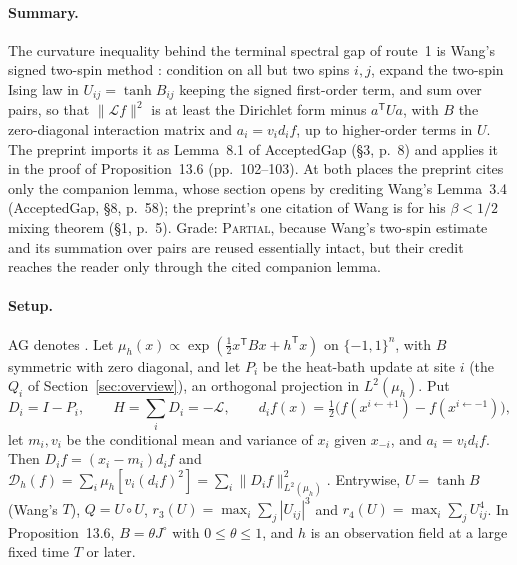 \documentclass[11pt]{article}
\newcommand{\D}{\mathcal{D}}
\newcommand{\Lgen}{\mathcal{L}}
\newcommand{\norm}[1]{\lVert #1\rVert}
\newcommand{\ploc}[2]{#1}
\newcommand{\sloc}[2]{\cite[#2]{#1}}
\newcommand{\grade}[1]{\textsc{#1}}
\begin{document}
\paragraph{Summary.}
The curvature inequality behind the terminal spectral gap of route~1 is
Wang's signed two-spin method
\sloc{Wang2026-OptimalMixingGlauberSKBetaHalf}{Lemma~3.4 and proof of
Thm~1.2, pp.~10--13}: condition on all but two spins $i,j$, expand the
two-spin Ising law in $U_{ij}=\tanh B_{ij}$ keeping the signed first-order
term, and sum over pairs, so that $\norm{\Lgen f}^2$ is at least the Dirichlet
form minus $a^{\mathsf T}Ua$, with $B$ the zero-diagonal interaction matrix and
$a_i=v_id_if$, up to higher-order terms in $U$. The
preprint imports it as Lemma~8.1 of AcceptedGap
\ploc{(\S3, p.~8)}{accepted-inputs.tex:91--94} and applies it in the proof
of \ploc{Proposition~13.6 (pp.~102--103)}{profile-positive.tex:1584--1698}.
At both places the preprint cites only the companion lemma, whose section
opens by crediting Wang's Lemma~3.4
\ploc{(AcceptedGap, \S8, p.~58)}{terminal.tex:8--11}; the preprint's one
citation of Wang is for his $\beta<1/2$ mixing theorem
\ploc{(\S1, p.~5)}{introduction.tex:182--185}.
Grade: \grade{Partial}, because Wang's two-spin estimate and its summation
over pairs are reused essentially intact, but their credit reaches the reader
only through the cited companion lemma.

\paragraph{Setup.}
AG denotes \cite{OAI-AcceptedGap}. Let
$\mu_h(x)\propto\exp(\frac12x^{\mathsf T}Bx+h^{\mathsf T}x)$ on
$\{-1,1\}^n$, with $B$ symmetric with zero diagonal, and let $P_i$ be the
heat-bath update at site $i$ (the $Q_i$ of Section~\ref{sec:overview}), an
orthogonal projection in $L^2(\mu_h)$. Put
\[
 D_i=I-P_i,\qquad H=\sum_iD_i=-\Lgen,\qquad
 d_if(x)=\tfrac12\bigl(f(x^{i\gets+1})-f(x^{i\gets-1})\bigr),
\]
let $m_i,v_i$ be the conditional mean and variance of $x_i$ given $x_{-i}$,
and $a_i=v_id_if$. Then $D_if=(x_i-m_i)d_if$ and
$\D_h(f)=\sum_i\mu_h[v_i(d_if)^2]=\sum_i\norm{D_if}^2_{L^2(\mu_h)}$.
Entrywise, $U=\tanh B$ (Wang's $T$), $Q=U\circ U$,
$r_3(U)=\max_i\sum_j|U_{ij}|^3$ and $r_4(U)=\max_i\sum_jU_{ij}^4$. In
Proposition~13.6, $B=\theta J^\circ$ with $0\le\theta\le1$, and $h$ is an
observation field at a large fixed time $T$ or later.
\end{document}

